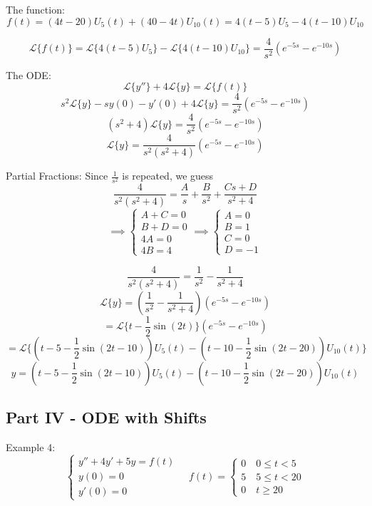 \documentclass[12pt]{article}
\renewcommand{\L}[1]{\mathcal{L}\{#1\}}
\begin{document}
The function:
\[f(t) = (4t - 20)U_5(t) + (40 - 4t)U_{10}(t) = 4(t- 5)U_5 - 4(t - 10)U_{10}\]

\[\L{f(t)} = \L{4(t- 5)U_5} - \L{4(t - 10)U_{10}} = \frac{4}{s^2} \left(e^{-5s} - e^{-10s}\right)\]

The ODE:
\[\L{y''} + 4\L{y} = \L{f(t)}\]
\[s^2 \L{y} - sy(0) - y'(0) + 4\L{y} = \frac{4}{s^2} \left(e^{-5s} - e^{-10s}\right)\]
\[(s^2 + 4)\L{y} = \frac{4}{s^2} \left(e^{-5s} - e^{-10s}\right)\]
\[\L{y} = \frac{4}{s^2(s^2 + 4)}\left(e^{-5s} - e^{-10s}\right)\]

Partial Fractions:
Since $\frac{1}{s^2}$ is repeated, we guess 
\[\frac{4}{s^2(s^2 + 4)} = \frac{A}{s} + \frac{B}{s^2} + \frac{Cs + D}{s^2 + 4}\]
\[\implies \begin{cases}
    A + C = 0\\
    B + D = 0\\
    4A = 0\\
    4B = 4
\end{cases} \implies \begin{cases}
    A = 0\\
    B = 1\\
    C = 0\\
    D = -1
\end{cases}\]

\[\frac{4}{s^2(s^2 + 4)} = \frac{1}{s^2} - \frac{1}{s^2 + 4}\]
\[\L{y} = \left(\frac{1}{s^2} - \frac{1}{s^2 + 4}\right)\left(e^{-5s} - e^{-10s}\right)\]
\[= \L{t - \frac{1}{2}\sin(2t)} \left(e^{-5s} - e^{-10s}\right)\]
\[= \L{\left(t - 5 - \frac{1}{2}\sin(2t - 10)\right)U_5(t) - \left(t - 10 - \frac{1}{2}\sin(2t - 20)\right)U_{10}(t)} \]
\[\boxed{y = \left(t - 5 - \frac{1}{2}\sin(2t - 10)\right)U_5(t) - \left(t - 10 - \frac{1}{2}\sin(2t - 20)\right)U_{10}(t)}\]

\subsection*{Part IV - ODE with Shifts}
Example 4: 
\[\begin{cases}
    y'' + 4y' + 5y = f(t)\\
    y(0) = 0\\
    y'(0) = 0
\end{cases}\quad f(t) = \begin{cases}
    0 \quad 0 \leq t < 5\\
    5 \quad 5 \leq t < 20\\
    0 \quad t \geq 20
\end{cases}\]
\end{document}

